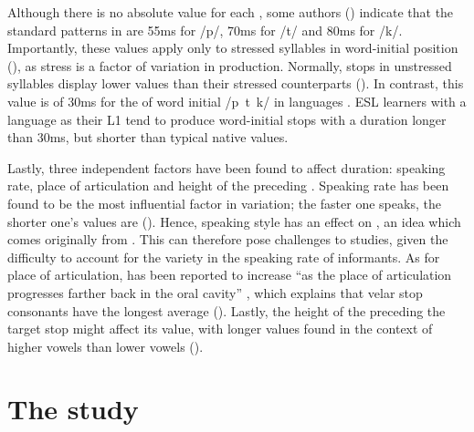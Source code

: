 \documentclass[output=paper]{langsci/langscibook}
\begin{document}
  Although there is no absolute value for each , some authors (\citealt{KentRead1992,ToribioEtAl2005}) indicate that the standard  patterns in  are 55ms for /p/, 70ms for /t/ and 80ms for /k/. Importantly, these values apply only to stressed syllables in word-initial position (\citealt{ReisNobre-Oliveira2007}), as stress is a factor of variation in  production. Normally, stops in unstressed syllables display lower  values than their stressed counterparts (\citealt{AbramsonLisker1967}). In contrast, this value is of 30ms for the  of word initial /p~t~k/ in  languages \cite{Yavaş2007,SchwartzhauptEtAl2014}. ESL learners with a  language as their L1 tend to produce  word-initial  stops with a duration longer than 30ms, but shorter than typical native values. 



  Lastly, three independent factors have been found to affect  duration: speaking rate, place of articulation and height of the preceding . Speaking rate has been found to be the most influential factor in  variation; the faster one speaks, the shorter one’s  values are (\citealt{ReisNobre-Oliveira2007,Mora2008,Bach2012}). Hence, speaking style has an effect on , an idea which comes originally from \citet{Labov1972}. This can therefore pose challenges to  studies, given the difficulty to account for the variety in the speaking rate of informants. As for place of articulation,  has been reported to increase “as the place of articulation progresses farther back in the oral cavity” \citep[260]{YavaşWildermuth2006}, which explains that velar stop consonants have the longest average  (\citealt{ChoLadefoged1999}). Lastly, the height of the  preceding the target stop might affect its  value, with longer  values found in the context of higher vowels than lower vowels (\citealt{FlegeEtAl1998,YavaşWildermuth2006}).



\section{The study}
\end{document}
